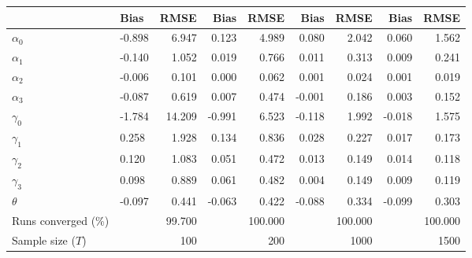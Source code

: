 
\begin{tabular}[t]{llrrrrrrr}
\toprule
  & Bias & RMSE & Bias & RMSE & Bias & RMSE & Bias & RMSE\\
\midrule
$\alpha_{0}$ & -0.898 & 6.947 & 0.123 & 4.989 & 0.080 & 2.042 & 0.060 & 1.562\\
$\alpha_{1}$ & -0.140 & 1.052 & 0.019 & 0.766 & 0.011 & 0.313 & 0.009 & 0.241\\
$\alpha_{2}$ & -0.006 & 0.101 & 0.000 & 0.062 & 0.001 & 0.024 & 0.001 & 0.019\\
$\alpha_{3}$ & -0.087 & 0.619 & 0.007 & 0.474 & -0.001 & 0.186 & 0.003 & 0.152\\
$\gamma_{0}$ & -1.784 & 14.209 & -0.991 & 6.523 & -0.118 & 1.992 & -0.018 & 1.575\\
$\gamma_{1}$ & 0.258 & 1.928 & 0.134 & 0.836 & 0.028 & 0.227 & 0.017 & 0.173\\
$\gamma_{2}$ & 0.120 & 1.083 & 0.051 & 0.472 & 0.013 & 0.149 & 0.014 & 0.118\\
$\gamma_{3}$ & 0.098 & 0.889 & 0.061 & 0.482 & 0.004 & 0.149 & 0.009 & 0.119\\
$\theta$ & -0.097 & 0.441 & -0.063 & 0.422 & -0.088 & 0.334 & -0.099 & 0.303\\
Runs converged (\%) &  & 99.700 &  & 100.000 &  & 100.000 &  & 100.000\\
Sample size ($T$) &  & 100 &  & 200 &  & 1000 &  & 1500\\
\bottomrule
\end{tabular}
